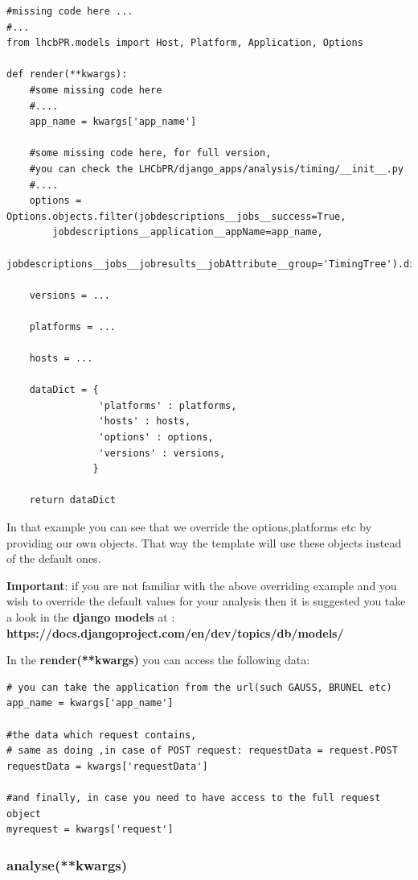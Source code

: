 \documentclass{lhcbnote}
\begin{document}
\begin{verbatim}
#missing code here ...
#...
from lhcbPR.models import Host, Platform, Application, Options

def render(**kwargs):
    #some missing code here
    #....
    app_name = kwargs['app_name']

    #some missing code here, for full version,
    #you can check the LHCbPR/django_apps/analysis/timing/__init__.py
    #....
    options = Options.objects.filter(jobdescriptions__jobs__success=True,
        jobdescriptions__application__appName=app_name,
        jobdescriptions__jobs__jobresults__jobAttribute__group='TimingTree').distinct().order_by('description')
        
    versions = ...
    
    platforms = ...
     
    hosts = ...
    
    dataDict = {
                'platforms' : platforms,
                'hosts' : hosts,
                'options' : options,
                'versions' : versions,
               }
      
    return dataDict
\end{verbatim} 

In that example you can see that we override the options,platforms etc by providing our own objects. That way
the template will use these objects instead of the default ones. 

{\bf Important}: if you are not familiar with the above overriding example and you wish to override the default values for your analysis then it is suggested you take a look in the {\bf django models} at :
 {\bf https://docs.djangoproject.com/en/dev/topics/db/models/}

\vspace{4 mm}
In the {\bf render(**kwargs)} you can access the following data:

\begin{verbatim}
# you can take the application from the url(such GAUSS, BRUNEL etc)
app_name = kwargs['app_name']

#the data which request contains,
# same as doing ,in case of POST request: requestData = request.POST
requestData = kwargs['requestData']

#and finally, in case you need to have access to the full request object
myrequest = kwargs['request']
\end{verbatim}

\subsubsection{analyse(**kwargs)}
\end{document}
